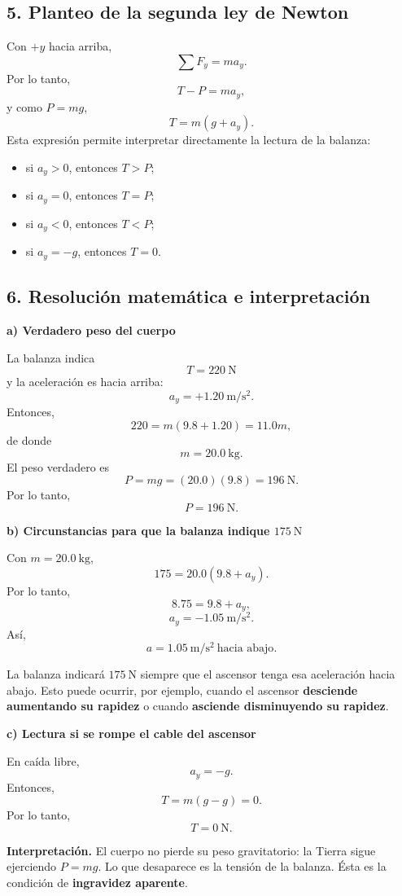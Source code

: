 \documentclass[12pt]{article}
\newcounter{ejercicio}
\newcommand{\paso}[2]{%
  \subsection*{\color{AzulFisica}#1. #2}%
}
\begin{document}
\paso{5}{Planteo de la segunda ley de Newton}
Con $+y$ hacia arriba,
\[
\sum F_y=ma_y.
\]
Por lo tanto,
\[
T-P=ma_y,
\]
y como $P=mg$,
\[
\boxed{T=m(g+a_y)}.
\]
Esta expresión permite interpretar directamente la lectura de la balanza:
\begin{itemize}[itemsep=2pt]
  \item si $a_y>0$, entonces $T>P$;
  \item si $a_y=0$, entonces $T=P$;
  \item si $a_y<0$, entonces $T<P$;
  \item si $a_y=-g$, entonces $T=0$.
\end{itemize}

\paso{6}{Resolución matemática e interpretación}

\textbf{a) Verdadero peso del cuerpo}

La balanza indica
\[
T=\SI{220}{\newton}
\]
y la aceleración es hacia arriba:
\[
a_y=+\SI{1.20}{\meter\per\second\squared}.
\]
Entonces,
\[
220=m(9.8+1.20)=11.0m,
\]
de donde
\[
m=\SI{20.0}{\kilogram}.
\]
El peso verdadero es
\[
P=mg=(20.0)(9.8)=\SI{196}{\newton}.
\]
Por lo tanto,
\[
\boxed{P=\SI{196}{\newton}}.
\]

\textbf{b) Circunstancias para que la balanza indique $\SI{175}{\newton}$}

Con $m=\SI{20.0}{\kilogram}$,
\[
175=20.0(9.8+a_y).
\]
Por lo tanto,
\[
8.75=9.8+a_y,
\]
\[
a_y=-\SI{1.05}{\meter\per\second\squared}.
\]
Así,
\[
\boxed{a=\SI{1.05}{\meter\per\second\squared}\ \text{hacia abajo}}.
\]

La balanza indicará $\SI{175}{\newton}$ siempre que el ascensor tenga esa aceleración hacia abajo. Esto puede ocurrir, por ejemplo, cuando el ascensor \textbf{desciende aumentando su rapidez} o cuando \textbf{asciende disminuyendo su rapidez}.

\textbf{c) Lectura si se rompe el cable del ascensor}

En caída libre,
\[
a_y=-g.
\]
Entonces,
\[
T=m(g-g)=0.
\]
Por lo tanto,
\[
\boxed{T=\SI{0}{\newton}}.
\]

\textbf{Interpretación.} El cuerpo no pierde su peso gravitatorio: la Tierra sigue ejerciendo $P=mg$. Lo que desaparece es la tensión de la balanza. Ésta es la condición de \textbf{ingravidez aparente}.

\vspace{0.5em}
\begin{center}
\end{center}
\end{document}
